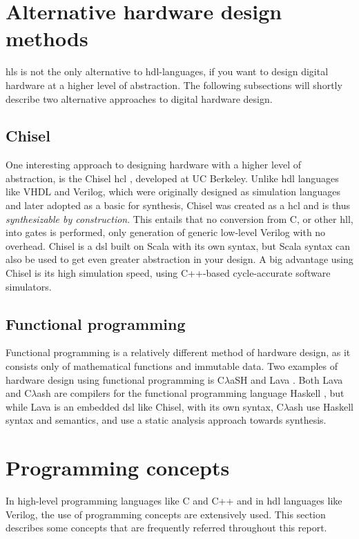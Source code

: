 \section{Alternative hardware design methods}
\gls{hls} is not the only alternative to \gls{hdl}-languages, if you want to design digital hardware at a higher level of abstraction. The following subsections will shortly describe two alternative approaches to digital hardware design. 
\subsection{Chisel}
One interesting approach to designing hardware with a higher level of abstraction, is the Chisel \gls{hcl} \cite{bachrach2012chisel}, developed at UC Berkeley. Unlike \gls{hdl} languages like VHDL and Verilog, which were originally designed as simulation languages and later adopted as a basic for synthesis, Chisel was created as a \gls{hcl} and is thus \textit{synthesizable by construction}. This entails that no conversion from C, or other \gls{hll}, into gates is performed, only generation of generic low-level Verilog with no overhead. Chisel is a \gls{dsl} built on Scala \cite{odersky2004overview} with its own syntax, but Scala syntax can also be used to get even greater abstraction in your design. A big advantage using Chisel is its high simulation speed, using C++-based cycle-accurate software simulators.

\subsection{Functional programming}
Functional programming is a relatively different method of hardware design, as it consists only of mathematical functions and immutable data. Two examples of hardware design using functional programming is C$\lambda$aSH \cite{baaij2009clash} and Lava \cite{bjesse1998lava}. Both Lava and C$\lambda$ash are compilers for the functional programming language Haskell \cite{haskellonline}, but while Lava is an embedded \gls{dsl} like Chisel, with its own syntax, C$\lambda$ash use Haskell syntax and semantics, and use a static analysis approach towards synthesis.

\section{Programming concepts}
In high-level programming languages like C and C++ and in \gls{hdl} languages like Verilog, the use of programming concepts are extensively used. This section describes some concepts that are frequently referred throughout this report.
